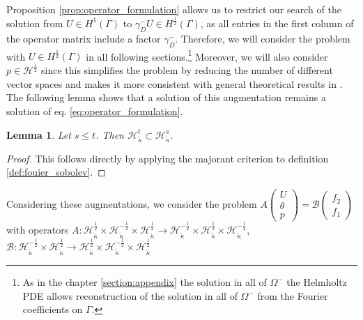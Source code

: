 \documentclass[12pt,journal,compsoc, onecolumn]{IEEEtran}
\newtheorem{lemma}[theorem]{Lemma}
\begin{document}
Proposition \ref{prop:operator_formulation} allows us to restrict our search of the solution from $U\in H^{1}(\Gamma)$ to $\gamma_D^- U \in H^{\frac{1}{2}}(\Gamma)$, as all entries in the first column of the operator matrix include a factor $\gamma_D^-$. Therefore, we will consider the problem with $ U \in H^{\frac{1}{2}}(\Gamma)$ in all following sections.\footnote{As in the chapter \ref{section:appendix} the solution in all of $\Omega^-$ the Helmholtz PDE allows reconstruction of the solution in all of $\Omega^-$ from the Fourier coefficients on $\Gamma$.}
Moreover, we will also consider $p \in \mathcal{H}^{\frac{1}{2}}$ since this simplifies the problem by reducing the number of different vector spaces  and makes it more consistent with general theoretical results in \cite{meury2007stable}. The following lemma shows that a solution of this augmentation  remains a solution of eq. \ref{eq:operator_formulation}.
\begin{lemma}
    Let $s \leq t$. Then $\mathcal{H}_{\tilde\kappa}^{t} \subset \mathcal{H}_{\tilde\kappa}^{s}$.
\end{lemma}
\begin{proof}
    This follows directly by applying the majorant criterion to definition \ref{def:fouier_sobolev}. 
\end{proof}  \noindent
Considering these augmentations, we consider the problem $A \begin{pmatrix}
U \\ \theta \\ p
\end{pmatrix} = \mathcal{B}\begin{pmatrix}f_{2} \\ f_{1} \end{pmatrix}$ with operators $A: \mathcal{H}_{\tilde \kappa}^{\frac{1}{2}} \times \mathcal{H}_{\tilde \kappa}^{-\frac{1}{2}} \times \mathcal{H}_{\tilde \kappa}^{\frac{1}{2}} \rightarrow 
\mathcal{H}_{\tilde \kappa}^{-\frac{1}{2}} \times \mathcal{H}_{\tilde \kappa}^{\frac{1}{2}} \times \mathcal{H}_{\tilde \kappa}^{-\frac{1}{2}}$, $\mathcal{B}: \mathcal{H}_{\tilde \kappa}^{-\frac{1}{2}}  \times \mathcal{H}_{\tilde \kappa}^{\frac{1}{2}}  \rightarrow \mathcal{H}_{\tilde \kappa}^{\frac{1}{2}} \times \mathcal{H}_{\tilde \kappa}^{-\frac{1}{2}}  \times \mathcal{H}_{\tilde \kappa}^{\frac{1}{2}}$
\end{document}

